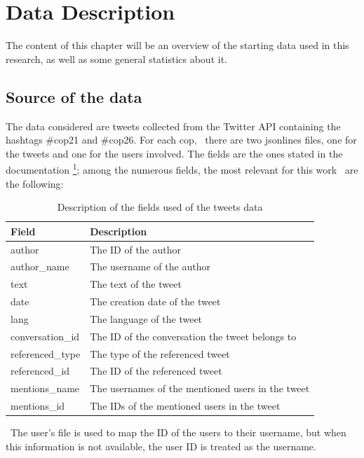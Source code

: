 
\chapter{Data Description}%
\label{ch:data}
The content of this chapter will be an overview of the starting data used in this research, as well as some general statistics about it.

\section{Source of the data}
The data considered are tweets collected from the Twitter API containing the hashtags \#cop21 and \#cop26. 
For each cop,  there are two jsonlines files, one for the tweets and one for the users involved. The fields are the ones stated in the documentation \href{https://docs.google.com/document/d/1C6DjDXXu-fHtpighvW524e6uD2eFxLOq/edit?pli=1\#heading=h.1pxezwc}{\textsuperscript{1}}; among the numerous fields, the most relevant for this work  are the following:

\begin{table}[H]
\centering
\begin{tabular}{|l|l|}
\hline
\textbf{Field} & \textbf{Description} \\ \hline
author & The ID of the author \\ \hline
author\_name & The username of the author \\ \hline
text & The text of the tweet \\ \hline
date & The creation date of the tweet \\ \hline
lang & The language of the tweet \\ \hline
conversation\_id & The ID of the conversation the tweet belongs to \\ \hline
referenced\_type & The type of the referenced tweet \\ \hline
referenced\_id & The ID of the referenced tweet \\ \hline
mentions\_name & The usernames of the mentioned users in the tweet \\ \hline
mentions\_id & The IDs of the mentioned users in the tweet \\ \hline

\end{tabular}
\caption{Description of the fields used of the tweets data}
\label{tab:my_label}
\end{table}
 The user’s file is used to map the ID of the users to their username, but when this information is not available, the user ID is treated as the username.


